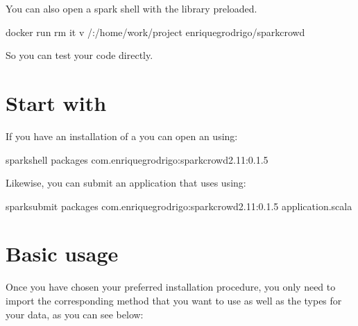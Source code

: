 \documentclass[letterpaper,10pt,english]{sphinxmanual}
\begin{document}
You can also open a spark shell with the library preloaded.

%
\begin{sphinxVerbatim}[commandchars=\\\{\}]
docker run \PYGZhy{}\PYGZhy{}rm \PYGZhy{}it \PYGZhy{}v /:/home/work/project enriquegrodrigo/spark\PYGZhy{}crowd
\end{sphinxVerbatim}

So you can test your code directly.


\section{Start with }
\label{\detokenize{usage/quickstart:start-with-spark-packages}}
If you have an installation of   a you can open an  using:

%
\begin{sphinxVerbatim}[commandchars=\\\{\}]
spark\PYGZhy{}shell \PYGZhy{}\PYGZhy{}packages com.enriquegrodrigo:spark\PYGZhy{}crowd\PYGZus{}2.11:0.1.5
\end{sphinxVerbatim}

Likewise, you can submit an application that uses  using:

%
\begin{sphinxVerbatim}[commandchars=\\\{\}]
spark\PYGZhy{}submit \PYGZhy{}\PYGZhy{}packages com.enriquegrodrigo:spark\PYGZhy{}crowd\PYGZus{}2.11:0.1.5 application.scala
\end{sphinxVerbatim}


\section{Basic usage}
\label{\detokenize{usage/quickstart:basic-usage}}
Once you have chosen your preferred installation procedure, you only need to import the corresponding method
that you want to use as well as the types for your data, as you can see below:
\end{document}
